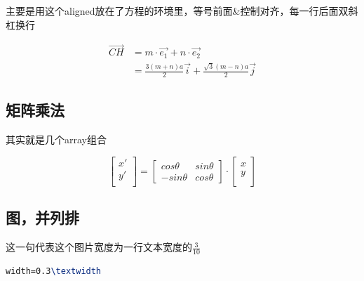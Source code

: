 \documentclass[AutoFakeBold]{template/LZUThesis2021_master}
\begin{document}
主要是用这个aligned放在了方程的环境里，等号前面\&控制对齐，每一行后面双斜杠换行

\begin{equation}
    \begin{aligned}
        \vec{CH} & = m\cdot \vec{e_1} + n\cdot \vec{e_2} \\
        & = \frac{3(m+n)a}{2} \vec{i} + \frac{\sqrt{3}(m-n)a}{2} \vec{j} 
    \end{aligned}
    \label{ch}
\end{equation}


\subsection{矩阵乘法} %
\label{sub:矩阵乘法}

其实就是几个array组合

\begin{equation}
    \left[ 
    \begin{array}{c}
    x'\\
    y'\\
    \end{array}
    \right]=
    \left[ 
    \begin{array}{cc}
    cos \theta & sin \theta \\
    - sin \theta & cos \theta 
    \end{array}
    \right]
    \cdot
    \left[ 
    \begin{array}{c}
        x\\
        y\\
    \end{array}
    \right]
\end{equation}


\subsection{图，并列排} %
\label{sub:图_并列排}

这一句代表这个图片宽度为一行文本宽度的$\frac{3}{10}$
\begin{lstlisting}[language = tex]
width=0.3\textwidth
\end{lstlisting}
\end{document}
